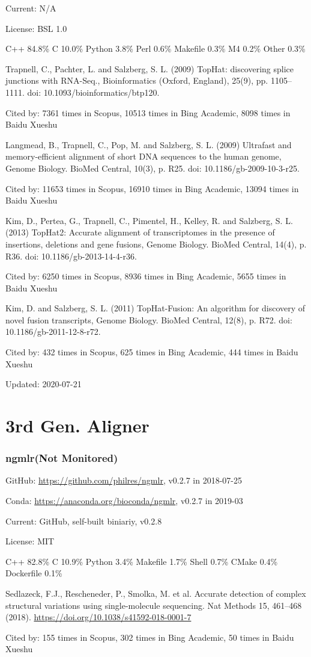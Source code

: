 \documentclass[]{article}
\newcommand{\nm}{{\color{red}(Not Monitored)}}
\newcommand{\cb}[3]{\par Cited by: {\color{blue}\Huge #1} times in Scopus, {\color{blue}\Huge #2} times in Bing Academic, {\color{blue}\Huge #3} times in Baidu Xueshu}
\begin{document}
Current: N/A

License: BSL 1.0

C++ 84.8\% C 10.0\% Python 3.8\% Perl 0.6\% Makefile 0.3\% M4 0.2\% Other 0.3\%

Trapnell, C., Pachter, L. and Salzberg, S. L. (2009) TopHat: discovering splice junctions with RNA-Seq., Bioinformatics (Oxford, England), 25(9), pp. 1105–1111. doi: 10.1093/bioinformatics/btp120.\cb{7361}{10513}{8098}

Langmead, B., Trapnell, C., Pop, M. and Salzberg, S. L. (2009) Ultrafast and memory-efficient alignment of short DNA sequences to the human genome, Genome Biology. BioMed Central, 10(3), p. R25. doi: 10.1186/gb-2009-10-3-r25.\cb{11653}{16910}{13094}

Kim, D., Pertea, G., Trapnell, C., Pimentel, H., Kelley, R. and Salzberg, S. L. (2013) TopHat2: Accurate alignment of transcriptomes in the presence of insertions, deletions and gene fusions, Genome Biology. BioMed Central, 14(4), p. R36. doi: 10.1186/gb-2013-14-4-r36.\cb{6250}{8936}{5655}

Kim, D. and Salzberg, S. L. (2011) TopHat-Fusion: An algorithm for discovery of novel fusion transcripts, Genome Biology. BioMed Central, 12(8), p. R72. doi: 10.1186/gb-2011-12-8-r72.\cb{432}{625}{444}

Updated: 2020-07-21

\part{3rd Gen. Aligner}

\section{ngmlr\nm}

GitHub: \url{https://github.com/philres/ngmlr}, v0.2.7 in 2018-07-25

Conda: \url{https://anaconda.org/bioconda/ngmlr}, v0.2.7 in 2019-03

Current: GitHub, self-built biniariy, v0.2.8

License: MIT

C++ 82.8\% C 10.9\% Python 3.4\% Makefile 1.7\% Shell 0.7\% CMake 0.4\% Dockerfile 0.1\% 

Sedlazeck, F.J., Rescheneder, P., Smolka, M. et al. Accurate detection of complex structural variations using single-molecule sequencing. Nat Methods 15, 461–468 (2018). \url{https://doi.org/10.1038/s41592-018-0001-7}\cb{155}{302}{50}
\end{document}

